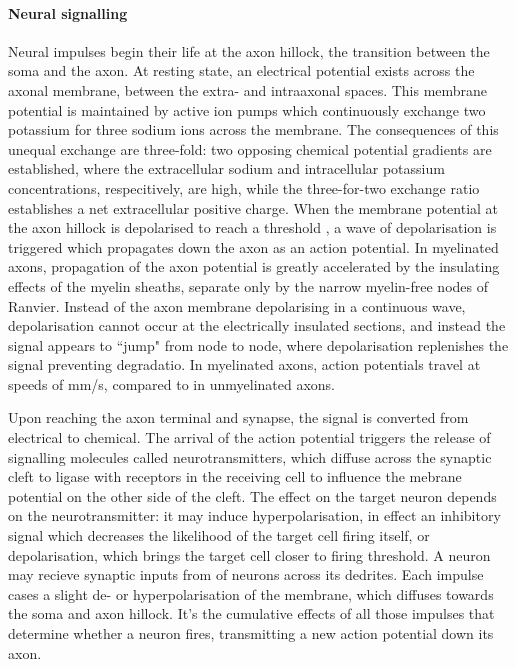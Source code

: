 \paragraph{Neural signalling}

Neural impulses begin their life at the axon hillock, the transition between the soma and the axon.
At resting state, an electrical potential exists across the axonal membrane, between the extra- and intraaxonal spaces.
This membrane potential is maintained by active ion pumps  which continuously exchange two potassium for three sodium ions across the membrane.
The consequences of this unequal exchange are three-fold: two opposing chemical potential gradients are established, where the extracellular sodium and intracellular potassium concentrations, respecitively, are high, while the three-for-two exchange ratio establishes a net extracellular positive charge.
When the membrane potential at the axon hillock is depolarised to reach a threshold , a wave of depolarisation is triggered which propagates down the axon as an action potential. 
In myelinated axons, propagation of the axon potential is greatly accelerated by the insulating effects of the myelin sheaths, separate only by the narrow myelin-free nodes of Ranvier.
Instead of the axon membrane depolarising in a continuous wave, depolarisation cannot occur at the electrically insulated sections, and instead the signal appears to ``jump" from node to node, where depolarisation replenishes the signal preventing degradatio. 
In myelinated axons, action potentials travel at speeds of  mm/s, compared to  in unmyelinated axons.

Upon reaching the axon terminal and synapse, the signal is converted from electrical to chemical.
The arrival of the action potential triggers the release of signalling molecules called neurotransmitters, which diffuse across the synaptic cleft to ligase with receptors in the receiving cell to influence the mebrane potential on the other side of the cleft.
The effect on the target neuron depends on the neurotransmitter: it may induce hyperpolarisation, in effect an inhibitory signal which decreases the likelihood of the target cell firing itself, or depolarisation, which brings the target cell closer to firing threshold.
A neuron may recieve synaptic inputs from  of neurons across its dedrites.
Each impulse cases a slight de- or hyperpolarisation of the membrane, which diffuses towards the soma and axon hillock.
It's the cumulative effects of all those impulses that determine whether a neuron fires, transmitting a new action potential down its axon.

